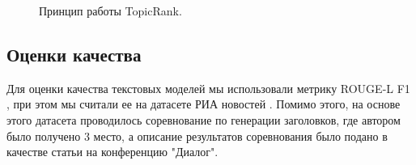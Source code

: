 \documentclass[aps,%
12pt,%
final,%
oneside,
onecolumn,%
musixtex, %
superscriptaddress,%
centertags]{article} %
\begin{document}
\begin{figure}[ht]
\begin{center}


\caption{
\label{topicrank}
        Принцип работы TopicRank.}
\end {center}
\end {figure}

%

\subsection{Оценки качества}
Для оценки качества текстовых моделей мы использовали метрику ROUGE-L F1 \cite{Lin:2004},
при этом мы считали ее на датасете РИА новостей \cite{gavrilov2018self}. Помимо этого,
на основе этого датасета проводилось соревнование по генерации заголовков, где автором было
получено 3 место, а описание результатов соревнования было подано в качестве статьи на конференцию
"Диалог".
\end{document}
